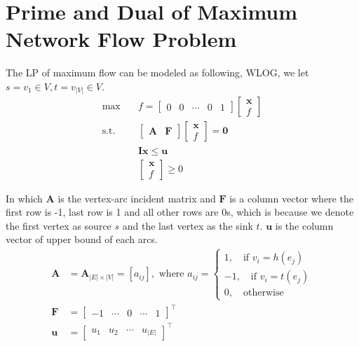 			\section{Prime and Dual of Maximum Network Flow Problem}
				The LP of maximum flow can be modeled as following, WLOG, we let $s = v_1 \in V, t = v_{|V|} \in V$.
				\begin{align}
					\max \quad & f = \left[\begin{matrix}0 & 0 & \cdots & 0 & 1\end{matrix}\right]\left[\begin{matrix}\mathbf{x} \\ f\end{matrix}\right]\\
					\text{s.t.} \quad & \left[\begin{matrix}\mathbf{A} & \mathbf{F}\end{matrix}\right]\left[\begin{matrix}\mathbf{x}\\ f\end{matrix}\right] = \mathbf{0}\\
					& \mathbf{Ix} \le \mathbf{u}\\
					& \left[\begin{matrix}\mathbf{x}\\ f\end{matrix}\right] \ge 0
				\end{align}

				In which $\mathbf{A}$ is the vertex-arc incident matrix and $\mathbf{F}$ is a column vector where the first row is -1, last row is 1 and all other rows are 0s, which is because we denote the first vertex as source $s$ and the last vertex as the sink $t$. $\mathbf{u}$ is the column vector of upper bound of each arcs.
				\begin{align}
					\mathbf{A} &= \mathbf{A}_{|E|\times |V|} = [a_{ij}], \text{ where } a_{ij} = \begin{cases}
						1, \quad \text{if $v_i = h(e_j)$} \\
						-1, \quad \text{if $v_i = t(e_j)$} \\
						0, \quad \text{otherwise}
					\end{cases}\\
					\mathbf{F} &= \left[\begin{matrix}-1 & \cdots & 0 & \cdots & 1\end{matrix}\right]^\top \\
					\mathbf{u} &= \left[\begin{matrix}u_1 & u_2 & \cdots & u_{|E|}\end{matrix}\right]^\top
				\end{align}

